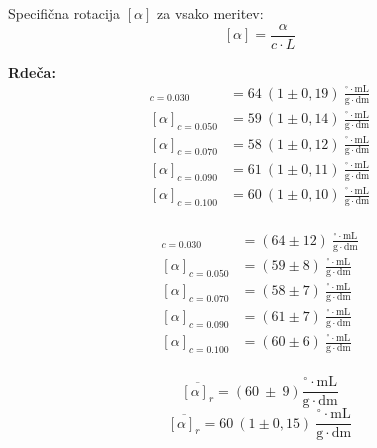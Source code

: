 \documentclass[9pt,a4paper,twocolumn,twoside]{tau-class/tau}
\begin{document}
Specifična rotacija $[\alpha]$ za vsako meritev:
\[
[\alpha] = \frac{\alpha}{c \cdot L}
\]

\begin{minipage}{0.24\textwidth}
\textbf{Rdeča:}
\begin{align*}
[\alpha]_{c=0.030} &= 64 \ (1 \pm 0{,}19) \ \frac{^\circ \cdot \mathrm{mL}}{\mathrm{g} \cdot \mathrm{dm}}\\
[\alpha]_{c=0.050} &= 59 \ (1 \pm 0{,}14) \ \frac{^\circ \cdot \mathrm{mL}}{\mathrm{g} \cdot \mathrm{dm}}\\
[\alpha]_{c=0.070} &= 58 \ (1 \pm 0{,}12) \ \frac{^\circ \cdot \mathrm{mL}}{\mathrm{g} \cdot \mathrm{dm}}\\
[\alpha]_{c=0.090} &= 61 \ (1 \pm 0{,}11) \ \frac{^\circ \cdot \mathrm{mL}}{\mathrm{g} \cdot \mathrm{dm}}\\
[\alpha]_{c=0.100} &= 60 \ (1 \pm 0{,}10) \ \frac{^\circ \cdot \mathrm{mL}}{\mathrm{g} \cdot \mathrm{dm}}\\
\end{align*}
\end{minipage}
\hfill
\begin{minipage}{0.24\textwidth}

\begin{align*}
[\alpha]_{c=0.030} &= (64 \pm 12) \ \frac{^\circ \cdot \mathrm{mL}}{\mathrm{g} \cdot \mathrm{dm}}\\
[\alpha]_{c=0.050} &= (59 \pm 8) \ \frac{^\circ \cdot \mathrm{mL}}{\mathrm{g} \cdot \mathrm{dm}}\\
[\alpha]_{c=0.070} &= (58 \pm 7) \ \frac{^\circ \cdot \mathrm{mL}}{\mathrm{g} \cdot \mathrm{dm}}\\
[\alpha]_{c=0.090} &= (61 \pm 7) \ \frac{^\circ \cdot \mathrm{mL}}{\mathrm{g} \cdot \mathrm{dm}}\\
[\alpha]_{c=0.100} &= (60 \pm 6) \ \frac{^\circ \cdot \mathrm{mL}}{\mathrm{g} \cdot \mathrm{dm}}\\
\end{align*}
\end{minipage}

\[
\overline{[\alpha]_{r}}  = (60 \ \pm \ 9)  \frac{^\circ \cdot \mathrm{mL}}{\mathrm{g} \cdot \mathrm{dm}}
\]
\[
\overline{[\alpha]_{r}} = 60 \ (1 \pm 0{,}15) \ \frac{^\circ \cdot \mathrm{mL}}{\mathrm{g} \cdot \mathrm{dm}}
\]

\vspace{1em}
\end{document}
